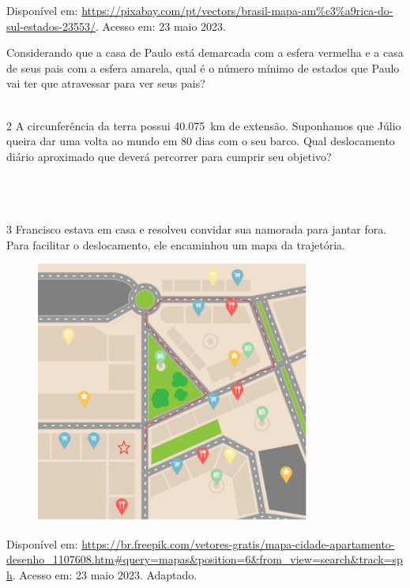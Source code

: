 Disponível em:
\url{https://pixabay.com/pt/vectors/brasil-mapa-am\%c3\%a9rica-do-sul-estados-23553/}.
Acesso em: 23 maio 2023.

Considerando que a casa de Paulo está demarcada com a esfera vermelha e
a casa de seus pais com a esfera amarela, qual é o número mínimo de
estados que Paulo vai ter que atravessar para ver seus pais?

\\

\num{2} A circunferência da terra possui 40.075~km de extensão. Suponhamos
que Júlio queira dar uma volta ao mundo em 80 dias com o seu barco. Qual
deslocamento diário aproximado que deverá percorrer para cumprir seu
objetivo?

\\
\\
\\

\num{3} Francisco estava em casa e resolveu convidar sua namorada para jantar
fora. Para facilitar o deslocamento, ele encaminhou um mapa da
trajetória.

\begin{figure}[H]
\centering\includegraphics[width=3.55in,height=3.406in]{./imgSAEB_8_MAT/media/image37.png}
\end{figure}

Disponível em:
\url{https://br.freepik.com/vetores-gratis/mapa-cidade-apartamento-desenho_1107608.htm\#query=mapas\&position=6\&from_view=search\&track=sph}.
Acesso em: 23 maio 2023. Adaptado.

